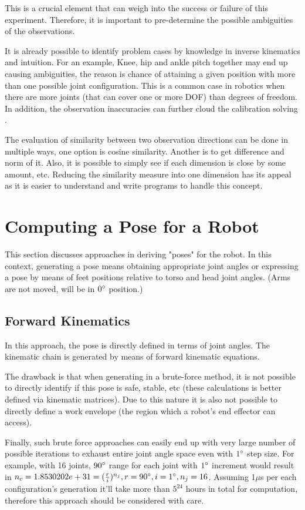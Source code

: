 \documentclass[english, printversion, nomenclature, notitle]{tuvisionthesis} %
\begin{document}
This is a crucial element that can weigh into the success or failure of this experiment. Therefore, it is important to pre-determine the possible ambiguities of the observations. 

It is already possible to identify problem cases by knowledge in inverse kinematics and intuition. For an example, Knee, hip and ankle pitch together may end up causing ambiguities, the reason is chance of attaining a given position with more than one possible joint configuration. This is a common case in robotics when there are more joints (that can cover one or more DOF) than degrees of freedom. In addition, the observation inaccuracies can further cloud the calibration solving \cite{multi-solution-inverse-kinematic}.

The evaluation of similarity between two observation directions can be done in multiple ways, one option is cosine similarity. Another is to get difference and norm of it. Also, it is possible to simply see if each dimension is close by some amount, etc. Reducing the similarity measure into one dimension has its appeal as it is easier to understand and write programs to handle this concept.

\section{Computing a Pose for a Robot}
This section discusses approaches in deriving "poses" for the robot. In this context, generating a pose means obtaining appropriate joint angles or expressing a pose by means of feet positions relative to torso and head joint angles. (Arms are not moved, will be in $0\degree$ position.)

\subsection{Forward Kinematics}
\label{subsec:forward_kinematics_gen}

In this approach, the pose is directly defined in terms of joint angles. The kinematic chain is generated by means of forward kinematic equations.

The drawback is that when generating in a brute-force method, it is not possible to directly identify if this pose is safe, stable, etc (these calculations is better defined via kinematic matrices). Due to this nature it is also not possible to directly define a work envelope (the region which a robot's end effector can access).

Finally, such brute force approaches can easily end up with very large number of possible iterations to exhaust entire joint angle space even with $1\degree$ step size. For example, with 16 joints, $90\degree$ range for each joint with $1\degree$ increment would result in $ n_c = 1.8530202e+31 = (\frac{r}{i})^{n_j}, r = 90\degree, i = 1\degree, n_j = 16$. Assuming 1$\mu$s per each configuration's generation it'll take more than $5^{24}$ hours in total for computation, therefore this approach should be considered with care.
\end{document}
